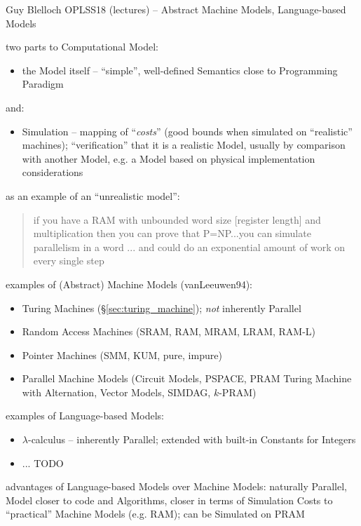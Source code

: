 \asterism

Guy Blelloch OPLSS18 (lectures)
--
Abstract Machine Models, Language-based Models

two parts to Computational Model:
\begin{itemize}
\item the Model itself -- ``simple'', well-defined Semantics close to
  Programming Paradigm
\end{itemize}
and:
\begin{itemize}
  \item Simulation -- mapping of ``\emph{costs}'' (good bounds when simulated on
    ``realistic'' machines); ``verification'' that it is a realistic Model,
    usually by comparison with another Model, e.g. a Model based on physical
    implementation considerations
\end{itemize}

as an example of an ``unrealistic model'':
\begin{quote}
if you have a RAM with unbounded word size [register length] and multiplication
then you can prove that P=NP...you can simulate parallelism in a word ... and
could do an exponential amount of work on every single step
\end{quote}

examples of (Abstract) Machine Models (vanLeeuwen94):
\begin{itemize}
  \item Turing Machines (\S\ref{sec:turing_machine}); \emph{not} inherently
    Parallel
  \item Random Access Machines (SRAM, RAM, MRAM, LRAM, RAM-L)
  \item Pointer Machines (SMM, KUM, pure, impure)
  \item Parallel Machine Models (Circuit Models, PSPACE, PRAM Turing Machine
    with Alternation, Vector Models, SIMDAG, $k$-PRAM)
\end{itemize}

examples of Language-based Models:
\begin{itemize}
  \item $\lambda$-calculus -- inherently Parallel; extended with built-in
    Constants for Integers
  \item ... TODO
\end{itemize}

advantages of Language-based Models over Machine Models: naturally Parallel,
Model closer to code and Algorithms, closer in terms of Simulation Costs to
``practical'' Machine Models (e.g. RAM); can be Simulated on PRAM

